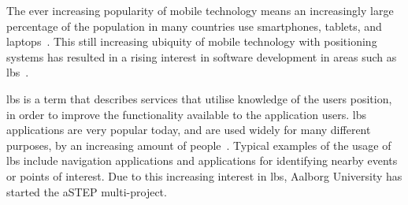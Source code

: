 The ever increasing popularity of mobile technology means an increasingly large percentage of the population in many countries use smartphones, tablets, and laptops~\cite{techcrunch_mobile_usage}. This still increasing ubiquity of mobile technology with positioning systems has resulted in a rising interest in software development in areas such as \gls{lbs}~\cite{dey2010location}. 

\gls{lbs} is a term that describes services that utilise knowledge of the users position, in order to improve the functionality available to the application users. \gls{lbs} applications are very popular today, and are used widely for many different purposes, by an increasing amount of people~\cite[1-2]{schiller2004location}. Typical examples of the usage of \gls{lbs} include navigation applications and applications for identifying nearby events or points of interest. Due to this increasing interest in \gls{lbs}, Aalborg University has started the aSTEP multi-project.